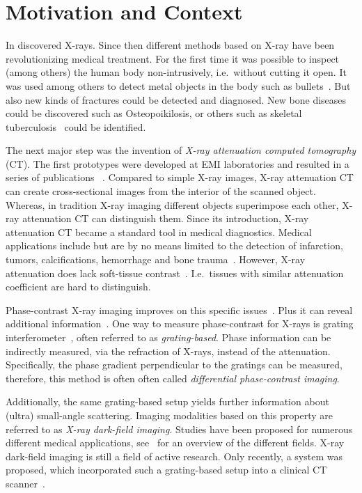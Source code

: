 \chapter{Motivation and Context}\label{chap:introduction}

In \citeyear{rontgen_uber_1895} \citeauthor{rontgen_uber_1895} discovered X-rays. Since then
different methods based on X-ray have been revolutionizing medical treatment. For the first time it
was possible to inspect (among others) the human body non-intrusively, i.e.\ without cutting it
open. It was used among others to detect metal objects in the body such as
bullets~\cite{haygood_skeletal_1996}. But also new kinds of fractures could be detected and
diagnosed. New bone diseases could be discovered such as Osteopoikilosis, or others such as skeletal
tuberculosis~\cite{haygood_skeletal_1996} could be identified.

The next major step was the invention of \textit{X-ray attenuation computed tomography} (CT). The
first prototypes were developed at EMI laboratories and resulted in a series of publications
~\cite{hounsfield_computerized_1973,ambrose_computerized_1973,perry_computerized_1973}. Compared to
simple X-ray images, X-ray attenuation CT can create cross-sectional images from the interior of the
scanned object. Whereas, in tradition X-ray imaging different objects superimpose each other, X-ray
attenuation CT can distinguish them. Since its introduction, X-ray attenuation CT became a standard
tool in medical diagnostics. Medical applications include but are by no means limited to the
detection of infarction, tumors, calcifications, hemorrhage and bone
trauma~\cite[Chapter~5]{buchanan_advanced_2012}. However, X-ray attenuation does lack soft-tissue
contrast~\cite{pfeiffer_phase_2006}. I.e.\ tissues with similar attenuation coefficient are hard to
distinguish.

Phase-contrast X-ray imaging improves on this specific issues~\cite{lewis_medical_2004}. Plus it can
reveal additional information~\cite{hahn_numerical_2012}. One way to measure phase-contrast for
X-rays is grating interferometer~\cite{pfeiffer_hard-x-ray_2008}, often referred to as
\textit{grating-based}. Phase information can be indirectly measured, via the refraction of X-rays,
instead of the attenuation. Specifically, the phase gradient perpendicular to the gratings can be
measured, therefore, this method is often often called \textit{differential phase-contrast imaging}.

Additionally, the same grating-based setup yields further information about (ultra) small-angle
scattering. Imaging modalities based on this property are referred to as \textit{X-ray dark-field
	imaging}. Studies have been proposed for numerous different medical applications,
see~\cite[Chapter 1.3.1]{wieczorek_anisotropic_2017} for an overview of the different fields. X-ray
dark-field imaging is still a field of active research. Only recently, a system was proposed, which
incorporated such a grating-based setup into a clinical CT scanner~\cite{viermetz_dark-field_2022}.

